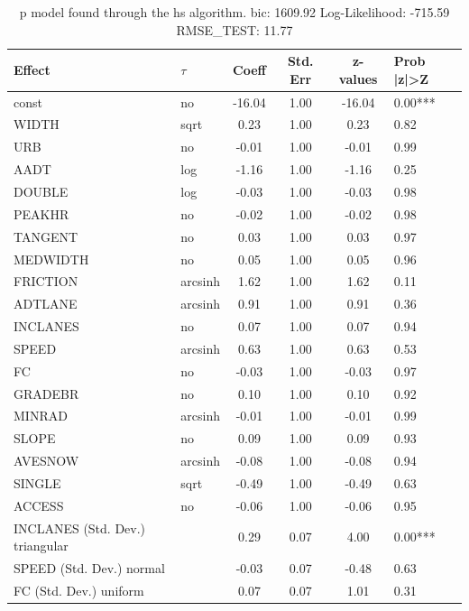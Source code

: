 \begin{table}
	\caption{p model found through the hs algorithm. bic: 1609.92 Log-Likelihood: -715.59 RMSE_TEST: 11.77}
	\begin{center}
		\begin{tabular}{|l|l|c|c|c|l|}
			\hline
			Effect & $\tau$ & Coeff & Std. Err & z-values & Prob |z|>Z \\
			\hline
			const & no & -16.04 & 1.00 & -16.04 & 0.00*** \\
			\hline
			WIDTH & sqrt & 0.23 & 1.00 & 0.23 & 0.82 \\
			\hline
			URB & no & -0.01 & 1.00 & -0.01 & 0.99 \\
			\hline
			AADT & log & -1.16 & 1.00 & -1.16 & 0.25 \\
			\hline
			DOUBLE & log & -0.03 & 1.00 & -0.03 & 0.98 \\
			\hline
			PEAKHR & no & -0.02 & 1.00 & -0.02 & 0.98 \\
			\hline
			TANGENT & no & 0.03 & 1.00 & 0.03 & 0.97 \\
			\hline
			MEDWIDTH & no & 0.05 & 1.00 & 0.05 & 0.96 \\
			\hline
			FRICTION & arcsinh & 1.62 & 1.00 & 1.62 & 0.11 \\
			\hline
			ADTLANE & arcsinh & 0.91 & 1.00 & 0.91 & 0.36 \\
			\hline
			INCLANES & no & 0.07 & 1.00 & 0.07 & 0.94 \\
			\hline
			SPEED & arcsinh & 0.63 & 1.00 & 0.63 & 0.53 \\
			\hline
			FC & no & -0.03 & 1.00 & -0.03 & 0.97 \\
			\hline
			GRADEBR & no & 0.10 & 1.00 & 0.10 & 0.92 \\
			\hline
			MINRAD & arcsinh & -0.01 & 1.00 & -0.01 & 0.99 \\
			\hline
			SLOPE & no & 0.09 & 1.00 & 0.09 & 0.93 \\
			\hline
			AVESNOW & arcsinh & -0.08 & 1.00 & -0.08 & 0.94 \\
			\hline
			SINGLE & sqrt & -0.49 & 1.00 & -0.49 & 0.63 \\
			\hline
			ACCESS & no & -0.06 & 1.00 & -0.06 & 0.95 \\
			\hline
			INCLANES (Std. Dev.) triangular &  & 0.29 & 0.07 & 4.00 & 0.00*** \\
			\hline
			SPEED (Std. Dev.) normal &  & -0.03 & 0.07 & -0.48 & 0.63 \\
			\hline
			FC (Std. Dev.) uniform &  & 0.07 & 0.07 & 1.01 & 0.31 \\

\end{tabular}
\end{center}
\end{table}

